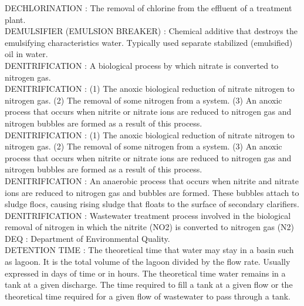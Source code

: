 \vspace{0.15cm}
DECHLORINATION :  The removal of chlorine from the effluent of a treatment plant.\\
\vspace{0.15cm}
DEMULSIFIER (EMULSION BREAKER) :  Chemical additive that destroys the emulsifying characteristics water. Typically used separate stabilized (emulsified) oil in water.\\
\vspace{0.15cm}
DENITRIFICATION :   A biological process by which nitrate is converted to nitrogen gas.\\
\vspace{0.15cm}
DENITRIFICATION :  (1)     The anoxic biological reduction of nitrate nitrogen to nitrogen gas.  (2)     The removal of some nitrogen from a system.  (3)     An anoxic process that occurs when nitrite or nitrate ions are reduced to nitrogen gas and nitrogen bubbles are formed as a result of this process.\\
\vspace{0.15cm}
DENITRIFICATION :  (1)     The anoxic biological reduction of nitrate nitrogen to nitrogen gas.  (2)     The removal of some nitrogen from a system.  (3)   An anoxic process that occurs when nitrite or nitrate ions are reduced to nitrogen gas and nitrogen bubbles are formed as a result of this process.\\
\vspace{0.15cm}
DENITRIFICATION :  An anaerobic process that occurs when nitrite and nitrate ions are reduced to nitrogen gas and bubbles are formed. These bubbles attach to sludge flocs, causing rising sludge that floats to the surface of secondary clarifiers.\\
\vspace{0.15cm}
DENITRIFICATION :  Wastewater treatment process involved in the biological removal of nitrogen in which the nitrite (NO2) is converted to nitrogen gas (N2)\\
\vspace{0.15cm}
DEQ :  Department of Environmental Quality. \\
\vspace{0.15cm}
DETENTION TIME :  The theoretical time that water may stay in a basin such as lagoon. It is the total volume of the lagoon divided by the flow rate. Usually expressed in days of time or in hours.  The theoretical time water remains in a tank at a given discharge.  The time required to fill a tank at a given flow or the theoretical time required for a given flow of wastewater to pass through a tank.\\
